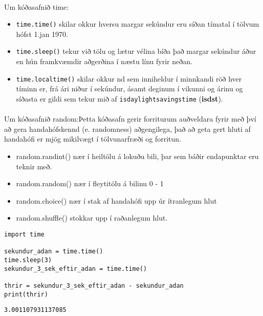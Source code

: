 \paragraph{}
Um kóðasafnið time:

\begin{itemize}
	\item \texttt{time.time()} skilar okkur hversu margar sekúndur eru síðan tímatal í tölvum hófst 1.jan 1970.
	\item \texttt{time.sleep()} tekur við tölu og lætur vélina bíða það margar sekúndur áður en hún framkvæmdir aðgerðina í næstu línu fyrir neðan.
	\item \texttt{time.localtime()} skilar okkur nd sem inniheldur í minnkandi röð hver tíminn er, frá ári niður í sekúndur, ásamt deginum í vikunni og árinu og síðasta er gildi sem tekur mið af \texttt{isdaylightsavingstime} (\textbf{isdst}).
\end{itemize}

\paragraph{}
Um kóðasafnið random:Þetta kóðasafn gerir forriturum auðveldara fyrir með því að gera handahófskennd (e. randomness) aðgengilega, það að geta gert hluti af handahófi er mjög mikilvægt í tölvunarfræði og forritun.

\begin{itemize}
	\item random.randint() nær í heiltölu á lokuðu bili, þar sem báðir endapunktar eru teknir með.
	\item random.random() nær í fleytitölu á bilinu 0 - 1
	\item random.choice() nær í stak af handahófi upp úr ítranlegum hlut
	\item random.shuffle() stokkar upp í raðanlegum hlut.
\end{itemize}

\begin{lstlisting}[caption=Notkun kóðasafna með time, label=lst:kóðasöfn-kynnt-time]
import time

sekundur_adan = time.time()
time.sleep(3)
sekundur_3_sek_eftir_adan = time.time()

thrir = sekundur_3_sek_eftir_adan - sekundur_adan
print(thrir)
\end{lstlisting}
\lstset{style=uttak}
\begin{lstlisting}
3.001107931137085
\end{lstlisting}
\lstset{style=venjulegt}

